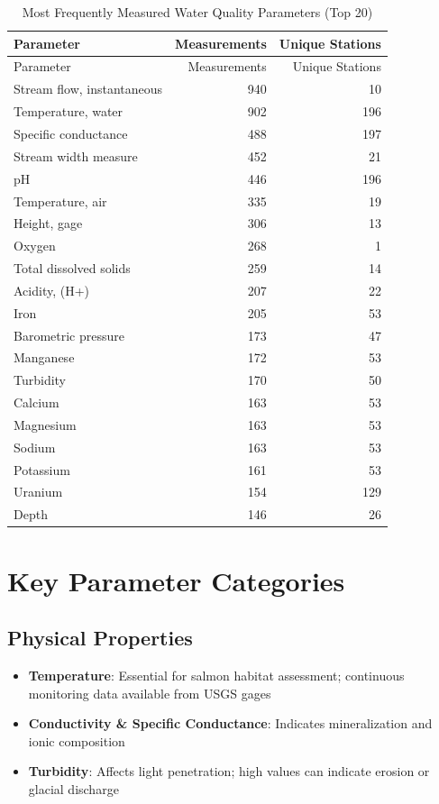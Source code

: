 \documentclass[
  letterpaper,
]{scrbook}
\providecommand{\tightlist}{%
  \setlength{\itemsep}{0pt}\setlength{\parskip}{0pt}}\usepackage{longtable,booktabs,array}
\begin{document}
\begin{longtable}[]{@{}lrr@{}}
\caption{Most Frequently Measured Water Quality Parameters (Top
20)}\tabularnewline
\toprule\noalign{}
Parameter & Measurements & Unique Stations \\
\midrule\noalign{}
\endfirsthead
\toprule\noalign{}
Parameter & Measurements & Unique Stations \\
\midrule\noalign{}
\endhead
\bottomrule\noalign{}
\endlastfoot
Stream flow, instantaneous & 940 & 10 \\
Temperature, water & 902 & 196 \\
Specific conductance & 488 & 197 \\
Stream width measure & 452 & 21 \\
pH & 446 & 196 \\
Temperature, air & 335 & 19 \\
Height, gage & 306 & 13 \\
Oxygen & 268 & 1 \\
Total dissolved solids & 259 & 14 \\
Acidity, (H+) & 207 & 22 \\
Iron & 205 & 53 \\
Barometric pressure & 173 & 47 \\
Manganese & 172 & 53 \\
Turbidity & 170 & 50 \\
Calcium & 163 & 53 \\
Magnesium & 163 & 53 \\
Sodium & 163 & 53 \\
Potassium & 161 & 53 \\
Uranium & 154 & 129 \\
Depth & 146 & 26 \\
\end{longtable}

\section{Key Parameter Categories}\label{key-parameter-categories}

\subsection{Physical Properties}\label{physical-properties}

\begin{itemize}
\tightlist
\item
  \textbf{Temperature}: Essential for salmon habitat assessment;
  continuous monitoring data available from USGS gages
\item
  \textbf{Conductivity \& Specific Conductance}: Indicates
  mineralization and ionic composition
\item
  \textbf{Turbidity}: Affects light penetration; high values can
  indicate erosion or glacial discharge
\end{itemize}
\end{document}
